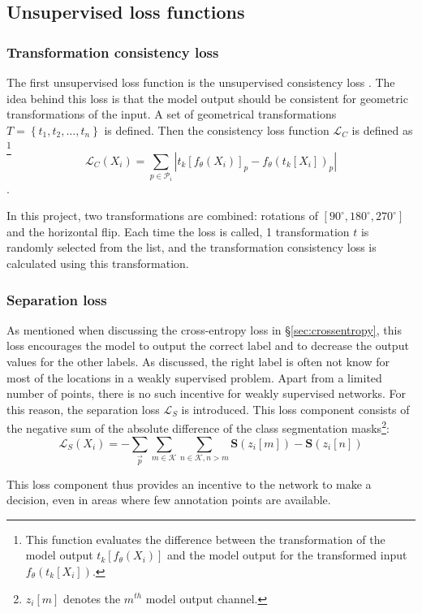 \subsection{Unsupervised loss functions}

\subsubsection{Transformation consistency loss}
The first unsupervised loss function is the unsupervised consistency loss . 
The idea behind this loss is that the model output should be consistent for geometric transformations of the input.
A set of geometrical transformations $T=\left\{ t_1, t_2, \dots, t_n \right\}$ is defined. 
Then the consistency loss function $\mathcal{L}_C$ is defined as
\footnote{This function evaluates the difference between the transformation of the model output $t_k\left[f_\theta(X_i)\right]$ and the model output for the transformed input $f_\theta\left( t_k[X_i] \right)$.}
\begin{equation}
    \mathcal{L}_C(X_i) = \sum_{p \in \mathcal{P}_i} \left| t_k\left[f_\theta(X_i)\right]_p - f_\theta\left( t_k[X_i] \right)_p  \right|  
\end{equation}.

In this project, two transformations are combined: rotations of $[90^{\circ}, 180^{\circ}, 270^{\circ}]$ and the horizontal flip.
Each time the loss is called, 1 transformation $t$ is randomly selected from the list, and the transformation consistency loss is calculated using this transformation.

\subsubsection{Separation loss}
As mentioned when discussing the cross-entropy loss in §\ref{sec:crossentropy}, this loss encourages the model to output the correct label and to decrease the output values for the other labels.
As discussed, the right label is often not know for most of the locations in a weakly supervised problem.
Apart from a limited number of points, there is no such incentive for weakly supervised networks.
For this reason, the separation loss $\mathcal{L}_S$ is introduced.
This loss component consists of the negative sum of the absolute difference of the class segmentation masks\footnote{$z_i[m]$ denotes the $m^{th}$ model output channel.}:
\begin{equation}
    \mathcal{L}_S(X_i) = - \sum_{\vec{p}} \sum_{m\in \mathcal{K}} \sum_{n \in \mathcal{K}, n>m} \mathbf{S}(z_i[m]) - \mathbf{S}(z_i[n])
\end{equation}

This loss component thus provides an incentive to the network to make a decision, even in areas where few annotation points are available.